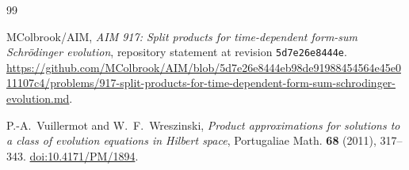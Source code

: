 \documentclass[11pt,a4paper]{article}
\theoremstyle{remark}
\begin{document}
\begin{thebibliography}{99}
\small
\setlength{\itemsep}{3pt}

MColbrook/AIM, \emph{AIM 917: Split products for time-dependent form-sum Schrödinger evolution},
repository statement at revision \texttt{5d7e26e8444e}.
\url{https://github.com/MColbrook/AIM/blob/5d7e26e8444eb98de91988454564e45e011107c4/problems/917-split-products-for-time-dependent-form-sum-schrodinger-evolution.md}.

P.-A.~Vuillermot and W.~F.~Wreszinski,
\emph{Product approximations for solutions to a class of evolution
equations in Hilbert space},
Portugaliae Math. \textbf{68} (2011), 317--343.
\href{https://doi.org/10.4171/PM/1894}{doi:10.4171/PM/1894}.
\end{thebibliography}
\end{document}
